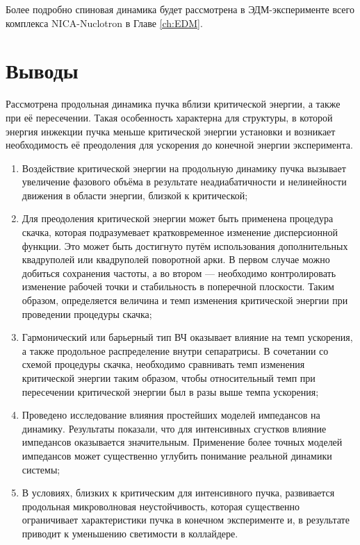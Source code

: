 \par Более подробно спиновая динамика будет рассмотрена в ЭДМ-эксперименте всего комплекса NICA-Nuclotron в Главе \ref{ch:EDM}.

\section*{Выводы}
\par Рассмотрена продольная динамика пучка вблизи критической энергии, а также при её пересечении. Такая особенность характерна для структуры, в которой энергия инжекции пучка меньше критической энергии установки и возникает необходимость её преодоления для ускорения до конечной энергии эксперимента.

\begin{enumerate}

\item Воздействие критической энергии на продольную динамику пучка вызывает увеличение фазового объёма в результате неадиабатичности и нелинейности движения в области энергии, близкой к критической;

\item Для преодоления критической энергии может быть применена процедура скачка, которая подразумевает кратковременное изменение дисперсионной функции. Это может быть достигнуто путём использования дополнительных квадруполей или квадруполей поворотной арки. В первом случае можно добиться сохранения частоты, а во втором — необходимо контролировать изменение рабочей точки и стабильность в поперечной плоскости. Таким образом, определяется величина и темп изменения критической энергии при проведении процедуры скачка;

\item Гармонический или барьерный тип ВЧ оказывает влияние на темп ускорения, а также продольное распределение внутри сепаратрисы. В сочетании со схемой процедуры скачка, необходимо сравнивать темп изменения критической энергии таким образом, чтобы относительный темп при пересечении критической энергии был в разы выше темпа ускорения;

\item Проведено исследование влияния простейших моделей импедансов на динамику. Результаты показали, что для интенсивных сгустков влияние импедансов оказывается значительным. Применение более точных моделей импедансов может существенно углубить понимание реальной динамики системы;

\item В условиях, близких к критическим для интенсивного пучка, развивается продольная микроволновая неустойчивость, которая существенно ограничивает характеристики пучка в конечном эксперименте и, в результате приводит к уменьшению светимости в коллайдере.

\end{enumerate}


\FloatBarrier
